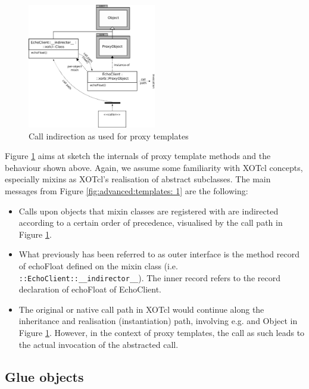 \begin{figure}[htbp]
\begin{center}
\includegraphics[width=0.5\textwidth]{img/proxy-template.png}
\caption{Call indirection as used for proxy templates}
\label{fig:advanced:templates:1}
\end{center}
\end{figure}

Figure \ref{fig:advanced:templates:1} aims at sketch the internals of proxy template methods and the 
behaviour shown above. Again, we assume some familiarity with XOTcl concepts, especially mixins as 
XOTcl's realisation of abstract subclasses. The main messages from Figure \ref{fig:advanced:templates:
1} are the following:
\begin{itemize}
\item Calls upon objects that mixin classes are registered with are indirected according to a certain order 
of precedence, visualised by the call path in Figure  \ref{fig:advanced:templates:1}.
\item What previously has been referred to as outer interface is the method record of echoFloat defined 
on the mixin class (i.e. \lstinline!::EchoClient::__indirector__!). The inner record refers to the record 
declaration of echoFloat of EchoClient.
\item The original or native call path in XOTcl would continue along the inheritance and realisation 
(instantiation) path, involving e.g.  and Object in Figure  \ref{fig:advanced:templates:1}. 
However, in the context of proxy templates, the call as such leads to the actual invocation of the 
abstracted call.
\end{itemize}
  \subsection{Glue objects}\label{sec:advanced:xorb:gobjects}
  
